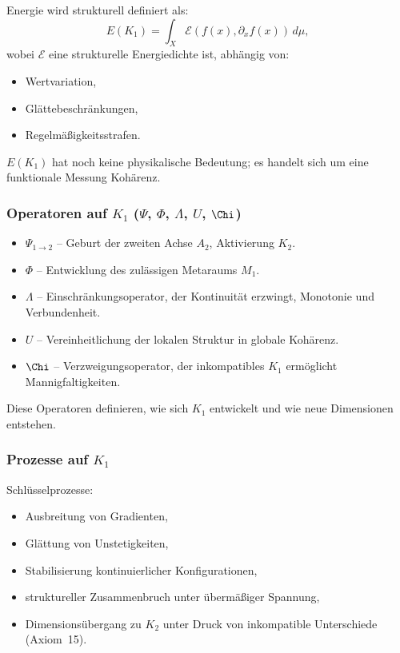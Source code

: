 Energie wird strukturell definiert als:
\[
E(K_1) = \int_X \mathcal{E}(f(x), \partial_x f(x))\, d\mu,
\]
wobei $\mathcal{E}$ eine strukturelle Energiedichte ist, abhängig von:
\begin{itemize}
    \item Wertvariation,
    \item Glättebeschränkungen,
    \item Regelmäßigkeitsstrafen.
\end{itemize}

$E(K_1)$ hat noch keine physikalische Bedeutung; es handelt sich um eine funktionale Messung
Kohärenz.

\subsubsection{Operatoren auf \texorpdfstring{$K_1$}{K_1} (\texorpdfstring{$\Psi$}{\Psi}, \texorpdfstring{$\Phi$}{\Phi}, \texorpdfstring{$\Lambda$}{\Lambda}, \texorpdfstring{$U$}{U}, \texorpdfstring{$\Chi$}{\Chi})}

\begin{itemize}
    \item $\Psi_{1\to2}$ – Geburt der zweiten Achse $A_2$, Aktivierung
          $K_2$.
    \item $\Phi$ – Entwicklung des zulässigen Metaraums $M_1$.
    \item $\Lambda$ – Einschränkungsoperator, der Kontinuität erzwingt,
          Monotonie und Verbundenheit.
    \item $U$ – Vereinheitlichung der lokalen Struktur in globale Kohärenz.
    \item $\Chi$ – Verzweigungsoperator, der inkompatibles $K_1$ ermöglicht
          Mannigfaltigkeiten.
\end{itemize}

Diese Operatoren definieren, wie sich $K_1$ entwickelt und wie neue Dimensionen entstehen.

\subsubsection{Prozesse auf \texorpdfstring{$K_1$}{K_1}}

Schlüsselprozesse:
\begin{itemize}
    \item Ausbreitung von Gradienten,
    \item Glättung von Unstetigkeiten,
    \item Stabilisierung kontinuierlicher Konfigurationen,
    \item struktureller Zusammenbruch unter übermäßiger Spannung,
    \item Dimensionsübergang zu $K_2$ unter Druck von
          inkompatible Unterschiede (Axiom~15).
\end{itemize}

